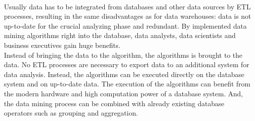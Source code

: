 \\
Usually data has to be integrated from databases and other data sources by ETL processes, resulting in the same disadvantages as for data warehouses: data is not up-to-date for the crucial analyzing phase and redundant. By implemented data mining algorithms right into the database, data analysts, data scientists and business executives gain huge benefits. 
\\
Instead of bringing the data to the algorithm, the algorithms is brought to the data. No ETL processes are necessary to export data to an additional system for data analysis. Instead, the algorithms can be executed directly on the database system and on up-to-date data. The execution of the algorithms can benefit from the modern hardware and high computation power of a database system. And, the data mining process can be combined with already existing database operators such as grouping and aggregation.


